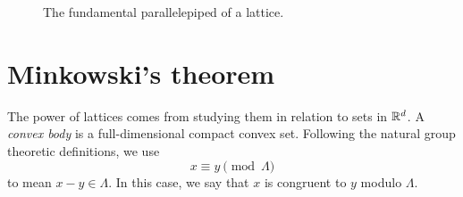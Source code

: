\begin{figure}
  \begin{center}
  \end{center}
  \caption{The fundamental parallelepiped of a lattice.}
  \label{fig:fundamental-parallelepiped}
\end{figure}



\section{Minkowski's theorem}

The power of lattices comes from studying them in relation to sets in $\mathbb{R}^d$.
A \emph{convex body} is a full-dimensional compact convex set.
Following the natural group theoretic definitions, we use
\[ x \equiv y \pmod{\Lambda} \]
to mean $x - y \in \Lambda$.
In this case, we say that $x$ is congruent to $y$ modulo $\Lambda$.

